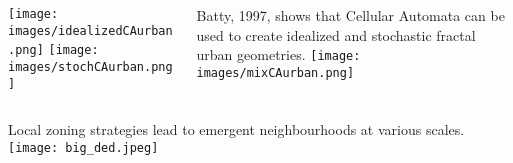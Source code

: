 \documentclass[xcolor=dvipsnames]{beamer}
\begin{document}
\begin{frame}
    \begin{columns}
        \begin{column}{0.4\linewidth}
            \texttt{[image: images/idealizedCAurban.png]}
            \texttt{[image: images/stochCAurban.png]}
        \end{column}
        \begin{column}{0.6\linewidth}
    Batty, 1997, shows that Cellular Automata can be used to create idealized and stochastic fractal urban geometries.
            \texttt{[image: images/mixCAurban.png]}
        \end{column}
    \end{columns}
\end{frame}
\begin{frame}
    Local zoning strategies lead to emergent neighbourhoods at various scales.
    \texttt{[image: big\_ded.jpeg]}
\end{frame}
\end{document}
